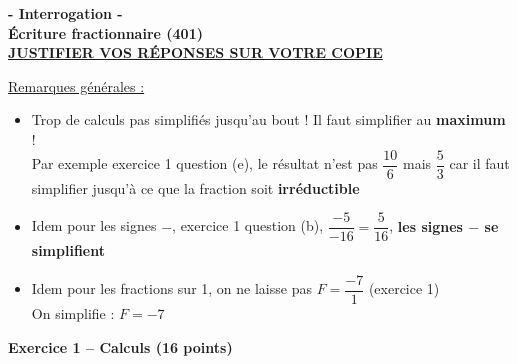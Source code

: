 \documentclass[12pt,a4paper]{exam}
\begin{document}
\begin{center}
\Large \textbf{- Interrogation -\\Écriture fractionnaire (401)}
\vspace{0.5cm}
\\\large \underline{\textbf{JUSTIFIER VOS RÉPONSES SUR VOTRE COPIE}}
\end{center}
\noindent\hrulefill
\vspace{0.5cm}

{\color{red}

\underline{Remarques générales :}

\vspace{5pt}
\begin{itemize}
    \item Trop de calculs pas simplifiés jusqu'au bout ! Il faut simplifier 
    au \textbf{maximum} !
    \\Par exemple exercice 1 question (e), le résultat n'est pas $\dfrac{10}{6}$ mais 
    $\dfrac{5}{3}$ car il faut simplifier jusqu'à ce que la fraction soit \textbf{irréductible}
    \item Idem pour les signes $-$, exercice 1 question (b), $\dfrac{-5}{-16} = \dfrac{5}{16}$, 
    \textbf{les signes $-$ se simplifient}
    \item Idem pour les fractions sur 1, on ne laisse pas $F = \dfrac{-7}{1}$ (exercice 1)
    \\On simplifie : $F = -7$
\end{itemize}

}


\vspace{0.5cm}




\textbf{Exercice 1 – Calculs (16 points)}
\vspace{5pt}
\end{document}
